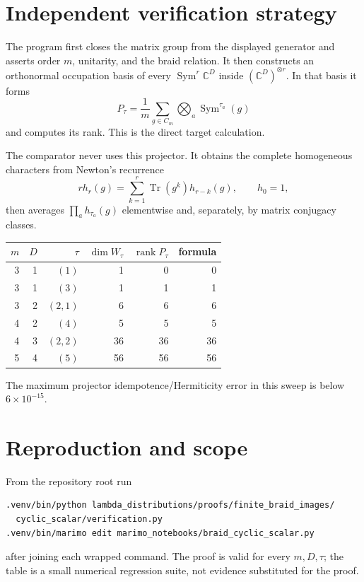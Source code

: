 \documentclass[11pt]{article}
\begin{document}
\section{Independent verification strategy}
The program first closes the matrix group from the displayed generator and
asserts order $m$, unitarity, and the braid relation.  It then constructs an
orthonormal occupation basis of every $\operatorname{Sym}^{r}\mathbb C^D$
inside $(\mathbb C^D)^{\otimes r}$.  In that basis it forms
\[
 P_\tau=\frac1m\sum_{g\in C_m}\bigotimes_a\operatorname{Sym}^{\tau_a}(g)
\]
and computes its rank.  This is the direct target calculation.

The comparator never uses this projector.  It obtains the complete
homogeneous characters from Newton's recurrence
\[
 r h_r(g)=\sum_{k=1}^r\operatorname{Tr}(g^k)h_{r-k}(g),\qquad h_0=1,
\]
then averages $\prod_a h_{\tau_a}(g)$ elementwise and, separately, by
matrix conjugacy classes.

\begin{center}
\begin{tabular}{@{}rrrrrr@{}}\toprule
$m$&$D$&$\tau$&$\dim W_\tau$&$\operatorname{rank}P_\tau$&formula\\\midrule
3&1&$(1)$&1&0&0\\
3&1&$(3)$&1&1&1\\
3&2&$(2,1)$&6&6&6\\
4&2&$(4)$&5&5&5\\
4&3&$(2,2)$&36&36&36\\
5&4&$(5)$&56&56&56\\\bottomrule
\end{tabular}
\end{center}
The maximum projector idempotence/Hermiticity error in this sweep is below
$6\times10^{-15}$.

\section{Reproduction and scope}
From the repository root run
\begin{verbatim}
.venv/bin/python lambda_distributions/proofs/finite_braid_images/
  cyclic_scalar/verification.py
.venv/bin/marimo edit marimo_notebooks/braid_cyclic_scalar.py
\end{verbatim}
after joining each wrapped command.  The proof is valid for every $m,D,\tau$;
the table is a small numerical regression suite, not evidence substituted for
the proof.
\end{document}
